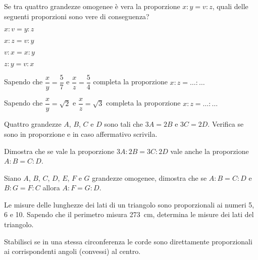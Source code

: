 \begin{multicols}{2}

\begin{esercizio}
\label{ese:6.13}
Se tra quattro grandezze omogenee è vera la proporzione $x : y = v : 
z$, quali delle seguenti proporzioni sono vere di conseguenza?
\begin{enumeratea}
\item $x : v = y : z$
\item $x : z = v : y$
\item $v : x = x : y$
\item $z : y = v : x$
\end{enumeratea}
\end{esercizio}

\begin{esercizio}
\label{ese:6.14}
Sapendo che $\dfrac{x}{y}=\dfrac{5}{7}$ e $\dfrac{x}{z}=\dfrac{5}{4}$ 
completa la proporzione $x : z = \ldots{} : \ldots{}$
\end{esercizio}

\begin{esercizio}
\label{ese:6.15}
Sapendo che $\dfrac{x}{y}=\sqrt{2}$ e $\dfrac{x}{z}=\sqrt{3}$ 
completa la proporzione $x : z = \ldots{} : \ldots{}$
\end{esercizio}

\begin{esercizio}
\label{ese:6.16}
Quattro grandezze $A$, $B$, $C$ e $D$ sono tali che $3A=2B$ e 
$3C=2D$. Verifica se sono in proporzione e in caso affermativo 
scrivila.
\end{esercizio}

\begin{esercizio}
\label{ese:6.17}
Dimostra che se vale la proporzione $3A : 2B = 3C : 2D$ vale anche la 
proporzione $A : B = C : D$.
\end{esercizio}

\begin{esercizio}
\label{ese:6.18}
Siano $A$, $B$, $C$, $D$, $E$, $F$ e $G$ grandezze omogenee, dimostra 
che se $A : B = C : D$ e $B : G = F : C$ allora $A : F = G : D$.
\end{esercizio}

\begin{esercizio}
\label{ese:6.19}
Le misure delle lunghezze dei lati di un triangolo sono proporzionali 
ai numeri 5, 6 e 10. Sapendo che il perimetro misura 273~cm, 
determina le misure dei lati del triangolo.
\end{esercizio}

\begin{esercizio}
\label{ese:6.20}
Stabilisci se in una stessa circonferenza le corde sono direttamente 
proporzionali ai corrispondenti angoli (convessi) al centro.
\end{esercizio}


\end{multicols}
